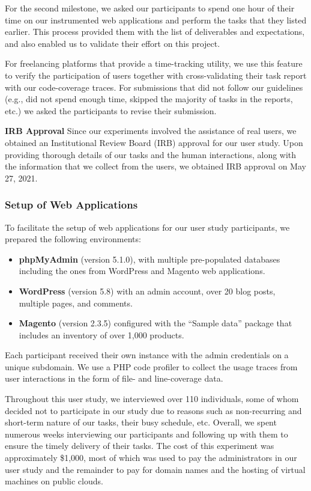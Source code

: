 For the second milestone, we asked our participants to spend one hour of their time on our instrumented web applications and perform the tasks that they listed earlier. 
This process provided them with the list of deliverables and expectations, and also enabled us to validate their effort on this project. 

For freelancing platforms that provide a time-tracking utility, we use this feature to verify the participation of users together with cross-validating their task report with our code-coverage traces. 
For submissions that did not follow our guidelines (e.g., did not spend enough time, skipped the majority of tasks in the reports, etc.) we asked the participants to revise their submission. 

\textbf{IRB Approval} Since our experiments involved the assistance of real users, we obtained an Institutional Review Board (IRB) approval for our user study. 
Upon providing thorough details of our tasks and the human interactions, along with the information that we collect from the users, we obtained IRB approval on May 27, 2021. 

\subsubsection{Setup of Web Applications}

To facilitate the setup of web applications for our user study participants, we prepared the following environments:

\begin{itemize}
    \item \textbf{phpMyAdmin} (version 5.1.0), with multiple pre-populated databases including the ones from WordPress and Magento web applications.
    \item \textbf{WordPress} (version 5.8) with an admin account, over 20 blog posts, multiple pages, and comments. 
    \item \textbf{Magento} (version 2.3.5) configured with the ``Sample data'' package that includes an inventory of over 1,000 products. 
\end{itemize}

Each participant received their own instance with the admin credentials on a unique subdomain. 
We use a PHP code profiler to collect the usage traces from user interactions in the form of file- and line-coverage data.  

Throughout this user study, we interviewed over 110 individuals, some of whom decided not to participate in our study due to reasons such as non-recurring and short-term nature of our tasks, their busy schedule, etc.
Overall, we spent numerous weeks interviewing our participants and following up with them to ensure the timely delivery of their tasks. The cost of this experiment was approximately \$1,000, most of which was used to pay the administrators in our user study and the remainder to pay for domain names and the hosting of virtual machines on public clouds.

